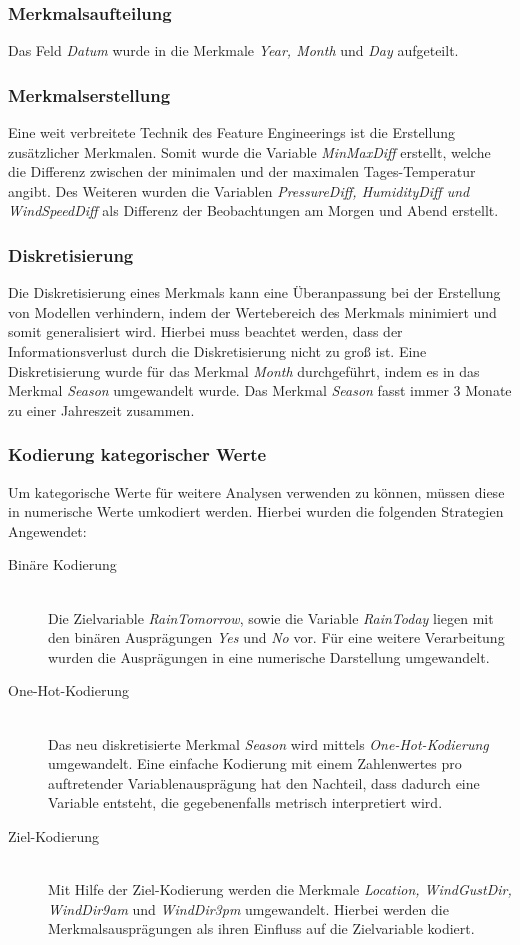 \subsubsection{Merkmalsaufteilung}
Das Feld \emph{Datum} wurde in die Merkmale \emph{Year, Month} und \emph{Day} aufgeteilt.

\subsubsection{Merkmalserstellung}
Eine weit verbreitete Technik des Feature Engineerings ist die Erstellung zusätzlicher Merkmalen. Somit wurde die Variable \emph{MinMaxDiff} erstellt, welche die Differenz zwischen der minimalen und der maximalen Tages-Temperatur angibt. Des Weiteren wurden die Variablen \emph{PressureDiff, HumidityDiff und WindSpeedDiff} als Differenz der Beobachtungen am Morgen und Abend erstellt.

\subsubsection{Diskretisierung}
Die Diskretisierung eines Merkmals kann eine Überanpassung bei der Erstellung von Modellen verhindern, indem der Wertebereich des Merkmals minimiert und somit generalisiert wird. Hierbei muss beachtet werden, dass der Informationsverlust durch die Diskretisierung nicht zu groß ist. Eine Diskretisierung wurde für das Merkmal \emph{Month} durchgeführt, indem es in das Merkmal \emph{Season} umgewandelt wurde. Das Merkmal \emph{Season} fasst immer 3 Monate zu einer Jahreszeit zusammen.

\subsubsection{Kodierung kategorischer Werte}
Um kategorische Werte für weitere Analysen verwenden zu können, müssen diese in numerische Werte umkodiert werden. Hierbei wurden die folgenden Strategien Angewendet:
\begin{description}
	\item[Binäre Kodierung]\hfill \\
	Die Zielvariable \emph{RainTomorrow}, sowie die Variable \emph{RainToday} liegen mit den binären Ausprägungen \emph{Yes} und \emph{No} vor. Für eine weitere Verarbeitung wurden die Ausprägungen in eine numerische Darstellung umgewandelt.
	\item[One-Hot-Kodierung]\hfill \\ 
	Das neu diskretisierte Merkmal \emph{Season} wird mittels \emph{One-Hot-Kodierung} umgewandelt. Eine einfache Kodierung mit einem Zahlenwertes pro auftretender Variablenausprägung hat den Nachteil, dass dadurch eine Variable entsteht, die gegebenenfalls metrisch interpretiert wird.
	\item[Ziel-Kodierung]\hfill \\ 
	Mit Hilfe der Ziel-Kodierung werden die Merkmale \emph{Location, WindGustDir, WindDir9am} und \emph{WindDir3pm} umgewandelt. Hierbei werden die Merkmalsausprägungen als ihren Einfluss auf die Zielvariable kodiert.
\end{description}

